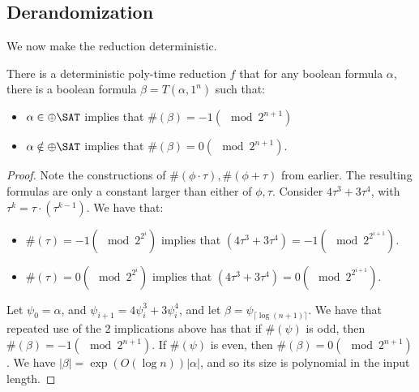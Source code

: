 \subsection{Derandomization}
We now make the reduction deterministic. 
\begin{lemma}
There is a deterministic poly-time reduction $f$ that for any boolean formula $\alpha$, there is a boolean formula $\beta = T(\alpha, 1^n)$ such that:
\begin{itemize}
\item $\alpha \in \ParitySAT$ implies that $\#(\beta) = -1 (\mod 2^{n+1})$
\item $\alpha \notin \ParitySAT$ implies that $\#(\beta) = 0 (\mod 2^{n+1})$.
\end{itemize}
\end{lemma}
\begin{proof}
Note the constructions of $\#(\phi\cdot\tau), \#(\phi+\tau)$ from earlier. The resulting formulas are only a constant larger than either of $\phi, \tau$. Consider $4\tau^3 + 3\tau^4$, with $\tau^k = \tau \cdot (\tau^{k-1})$. We have that:
\begin{itemize}
\item $\#(\tau) = -1 (\mod 2^{2^i})$ implies that $(4\tau^3 + 3\tau^4) = -1 (\mod 2^{2^{i+1}})$.
\item $\#(\tau) = 0 (\mod 2^{2^i})$ implies that $(4\tau^3 + 3\tau^4) = 0 (\mod 2^{2^{i+1}})$.
\end{itemize}
Let $\psi_0 = \alpha$, and $\psi_{i+1} = 4\psi_i^3 + 3\psi_i^4$, and let $\beta = \psi_{\lceil \log(n+1)\rceil}$. We have that repeated use of the 2 implications above has that if $\#(\psi)$ is odd, then $\#(\beta) = -1 (\mod 2^{n+1})$. If $\#(\psi)$ is even, then $\#(\beta) = 0 (\mod 2^{n+1})$. We have $|\beta| = \exp(O(\log n))|\alpha|$, and so its size is polynomial in the input length.
\end{proof}

